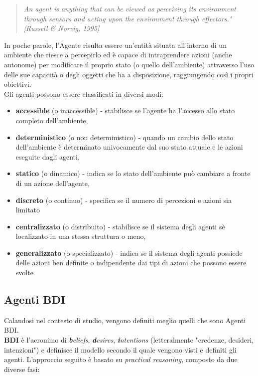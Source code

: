 \documentclass[12pt,a4paper,openright,oneside]{report}
\begin{document}
\begin{quotation}
	\textit{
	An agent is anything that can be viewed as perceiving its
	environment through sensors and acting upon the
	environment through effectors." [Russell \& Norvig, 1995]}
\end{quotation}

In poche parole, l'Agente risulta essere un'entità situata all'interno di un ambiente che riesce a percepirlo ed è capace di intraprendere azioni (anche autonome) per modificare il proprio stato (o quello dell'ambiente) attraverso l'uso delle sue capacità o degli oggetti che ha a disposizione, raggiungendo così i propri obiettivi.\\

Gli agenti possono essere classificati in diversi modi:
\begin{itemize}
	\item \textbf{accessible} (o inaccessible) - stabilisce se l'agente ha l'accesso allo stato completo dell'ambiente,
	
	\item \textbf{deterministico} (o non deterministico) - quando un cambio dello stato dell'ambiente è determinato univocamente dal suo stato attuale e le azioni eseguite dagli agenti,
	
	\item \textbf{statico} (o dinamico) - indica se lo stato dell'ambiente può cambiare a fronte di un azione dell'agente,
	
	\item \textbf{discreto} (o continuo) - specifica se il numero di percezioni e azioni sia limitato
	
	\item \textbf{centralizzato} (o distribuito) - stabilisce se il sistema degli agenti sè localizzato in una stessa struttura o meno,
	
	\item \textbf{generalizzato} (o specializzato) - indica se il sistema degli agenti  possiede delle azioni ben definite o indipendente dai tipi di azioni che possono essere svolte.
\end{itemize}


\subsection{Agenti BDI}
Calandosi nel contesto di studio, vengono definiti meglio quelli che sono Agenti BDI.\\

\textbf{BDI} è l'acronimo di \textit{\textbf{b}eliefs}, \textit{\textbf{d}esires}, \textit{\textbf{i}ntentions} (letteralmente "credenze, desideri, intenzioni") e definisce il modello secondo il quale vengono visti e definiti gli agenti. L'approccio seguito è basato su \textit{practical reasoning}, composto da due diverse fasi:
\end{document}
